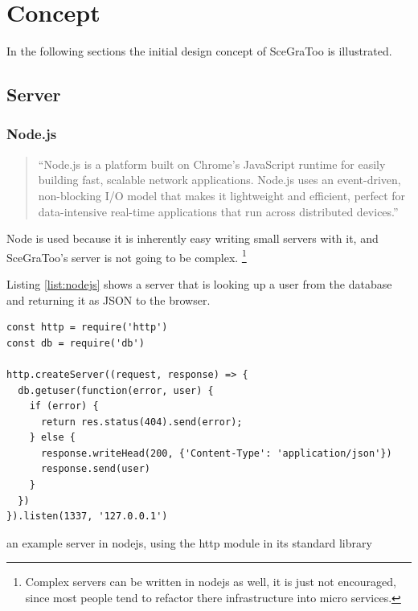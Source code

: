 
\section{Concept}
\label{concept}


In the following sections the initial design concept of \gls{SceGraToo} is illustrated.

\subsection{Server}
\label{server}

\subsubsection{Node.js}
\begin{quote}
  ``Node.js is a platform built on Chrome's JavaScript runtime for easily building fast, scalable network applications. Node.js uses an event-driven, non-blocking I/O model that makes it lightweight and efficient, perfect for data-intensive real-time applications that run across distributed devices.'' \cite{nodejs}
\end{quote}

Node is used because it is inherently easy writing small servers with it, and
SceGraToo's server is not going to be complex. \footnote{Complex servers can be
written in nodejs as well, it is just not encouraged, since most people tend to
refactor there infrastructure into micro services.}

Listing \ref{list:nodejs} shows a server that is looking up a user from the database and returning it as \gls{JSON} to the browser.

\begin{listing}
  \begin{verbatim}
const http = require('http')
const db = require('db')

http.createServer((request, response) => {
  db.getuser(function(error, user) {
    if (error) {
      return res.status(404).send(error);
    } else {
      response.writeHead(200, {'Content-Type': 'application/json'})
      response.send(user)
    }
  })
}).listen(1337, '127.0.0.1')
  \end{verbatim}
  \caption{an example server in nodejs, using the http module in its standard library}
  \label{list:nodejs}
\end{listing}

